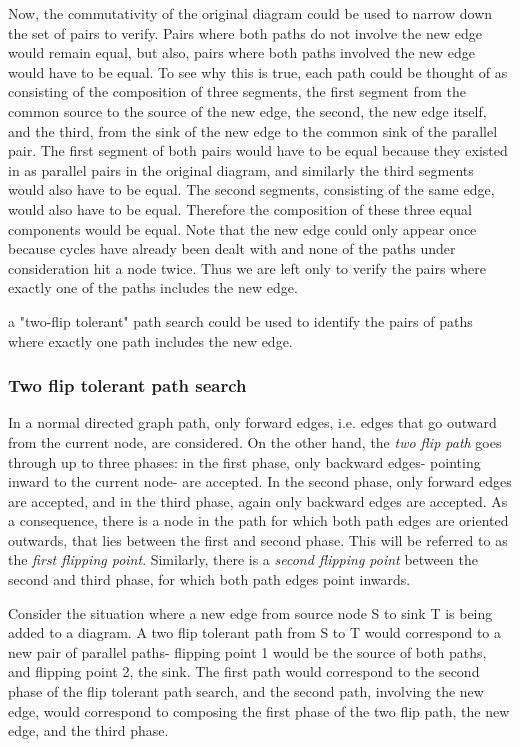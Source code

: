 \documentclass[runningheads]{llncs}
\begin{document}
Now, the commutativity of the original diagram could be used to narrow down the set of pairs to verify. Pairs where both paths do not involve the new edge would remain equal, but also, pairs where both paths involved the new edge would have to be equal. To see why this is true, each path could be thought of as consisting of the composition of three segments, the first segment from the common source to the source of the new edge, the second, the new edge itself, and the third, from the sink of the new edge to the common sink of the parallel pair. The first segment of both pairs would have to be equal because they existed in as parallel pairs in the original diagram, and similarly the third segments would also have to be equal. The second segments, consisting of the same edge, would also have to be equal. Therefore the composition of these three equal components would be equal. Note that the new edge could only appear once because cycles have already been dealt with and none of the paths under consideration hit a node twice. Thus we are left only to verify the pairs where exactly one of the paths includes the new edge.

a "two-flip tolerant" path search could be used to identify the pairs of paths where exactly one path includes the new edge. 

\subsubsection{Two flip tolerant path search}
In a normal directed graph path, only forward edges, i.e. edges that go outward from the current node, are considered. 
On the other hand, the \textit{two flip path} goes through up to three phases: in the first phase, only backward edges- pointing inward to the current node- are accepted. In the second phase, only forward edges are accepted, and in the third phase, again only backward edges are accepted. As a consequence, there is a node in the path for which both path edges are oriented outwards, that lies between the first and second phase. This will be referred to as the \textit{first flipping point}. Similarly, there is a \textit{second flipping point} between the second and third phase, for which both path edges point inwards.

Consider the situation where a new edge from source node S to sink T is being added to a diagram.
A two flip tolerant path from S to T would correspond to a new pair of parallel paths- flipping point 1 would be the source of both paths, and flipping point 2, the sink. The first path would correspond to the second phase of the flip tolerant path search, and the second path, involving the new edge, would correspond to composing the first phase of the two flip path, the new edge, and the third phase.
\end{document}
